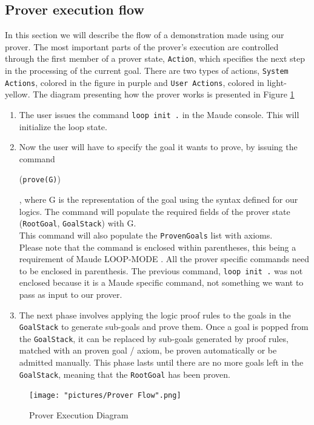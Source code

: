 \documentclass[12pt,a4paper]{article}
\begin{document}
{\subsection{Prover execution flow}
In this section we will describe the flow of a demonstration made using our prover. The most important parts of the prover's execution are controlled through the first member of a prover state, \texttt{Action}, which specifies the next step in the processing of the current goal. There are two types of actions, \texttt{System Actions}, colored in the figure in purple and \texttt{User Actions}, colored in light-yellow. The diagram presenting how the prover works is presented in Figure \ref{fig:ProverDiagram}
\\
\begin{enumerate}
	\item The user issues the command \texttt{loop init .} in the Maude console. This will initialize the loop state.
	\item Now the user will have to specify the goal it wants to prove, by issuing the command \begin{center}(\texttt{prove(G)})\end{center}, where G is the representation of the goal using the syntax defined for our logics. The command will populate the required fields of the prover state (\texttt{RootGoal}, \texttt{GoalStack}) with G.
	\\
	
	This command will also populate the \texttt{ProvenGoals} list with axioms.
	\\
	
	Please note that the command is enclosed within parentheses, this being a requirement of Maude LOOP-MODE \cite{manual}. All the prover specific commands need to be enclosed in parenthesis. The previous command, \texttt{loop init .} was not enclosed because it is a Maude specific command, not something we want to pass as input to our prover.
	\item The next phase involves applying the logic proof rules to the goals in the \texttt{GoalStack} to generate sub-goals and prove them. Once a goal is popped from the \texttt{GoalStack}, it can be replaced by sub-goals generated by proof rules, matched with an proven goal / axiom, be proven automatically or be admitted manually. This phase lasts until there are no more goals left in the \texttt{GoalStack}, meaning that the \texttt{RootGoal} has been proven.
\end{enumerate}
\begin{figure}[h!]
	\texttt{[image: "pictures/Prover Flow".png]}
	\caption{Prover Execution Diagram}
	\label{fig:ProverDiagram}
\end{figure} 
}
\end{document}
